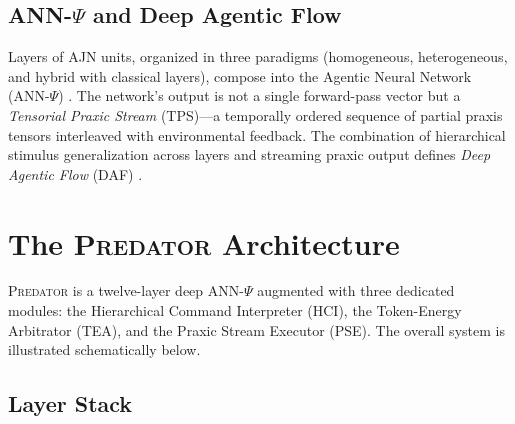 \documentclass[12pt,a4paper]{article}
\newcommand{\PREDATOR}{\textsc{Predator}}
\begin{document}
\subsection{ANN-\texorpdfstring{$\Psi$}{Psi} and Deep Agentic Flow}

Layers of AJN units, organized in three paradigms (homogeneous, heterogeneous,
and hybrid with classical layers), compose into the Agentic Neural Network
(ANN-$\Psi$) \cite{tapiador2024annpsi}. The network's output is not a single
forward-pass vector but a \textit{Tensorial Praxic Stream} (TPS)---a temporally
ordered sequence of partial praxis tensors interleaved with environmental
feedback. The combination of hierarchical stimulus generalization across layers
and streaming praxic output defines \textit{Deep Agentic Flow} (DAF)
\cite{tapiador2024daf}.

\section{The \PREDATOR{} Architecture}
\label{sec:architecture}

\PREDATOR{} is a twelve-layer deep ANN-$\Psi$ augmented with three dedicated
modules: the Hierarchical Command Interpreter (HCI), the Token-Energy
Arbitrator (TEA), and the Praxic Stream Executor (PSE). The overall system is
illustrated schematically below.

\subsection{Layer Stack}
\end{document}
